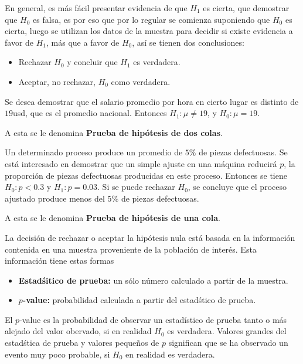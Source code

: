 En general, es m\'as f\'acil presentar evidencia de que $H_{1}$ es cierta, que demostrar 	que $H_{0}$ es falsa, es por eso que por lo regular se comienza suponiendo que $H_{0}$ es cierta, luego se utilizan los datos de la muestra para decidir si existe evidencia a favor de $H_{1}$, m\'as que a favor de $H_{0}$, as\'i se tienen dos conclusiones:
\begin{itemize}
\item Rechazar $H_{0}$ y concluir que $H_{1}$ es verdadera.
\item Aceptar, no rechazar, $H_{0}$ como verdadera.
\end{itemize}

\begin{Ejem}
Se desea demostrar que el salario promedio  por hora en cierto lugar es distinto de $19$usd, que es el promedio nacional. Entonces $H_{1}:\mu\neq19$, y $H_{0}:\mu=19$.
\end{Ejem}
A esta se le denomina \textbf{Prueba de hip\'otesis de dos colas}.

\begin{Ejem}
Un determinado proceso produce un promedio de $5\%$ de piezas defectuosas. Se est\'a interesado en demostrar que un simple ajuste en una m\'aquina reducir\'a $p$, la proporci\'on de piezas defectuosas producidas en este proceso. Entonces se tiene $H_{0}:p<0.3$ y $H_{1}:p=0.03$. Si se puede rechazar $H_{0}$, se concluye que el proceso ajustado produce menos del $5\%$ de piezas defectuosas.
\end{Ejem}
A esta se le denomina \textbf{Prueba de hip\'otesis de una cola}.

La decisi\'on de rechazar o aceptar la hip\'otesis nula est\'a basada en la informaci\'on contenida en una muestra proveniente de la poblaci\'on de inter\'es. Esta informaci\'on tiene estas formas

\begin{itemize}
\item \textbf{Estad\'sitico de prueba:} un s\'olo n\'umero calculado a partir de la muestra.

\item \textbf{$p$-value:} probabilidad calculada a partir del estad\'stico de prueba.

\end{itemize}

\begin{Def}
El $p$-value es la probabilidad de observar un estad\'istico de prueba tanto o m\'as alejado del valor obervado, si en realidad $H_{0}$ es verdadera.\medskip
Valores grandes del estad\'stica de prueba  y valores peque\~nos de $p$ significan que se ha observado un evento muy poco probable, si $H_{0}$ en realidad es verdadera.
\end{Def}

